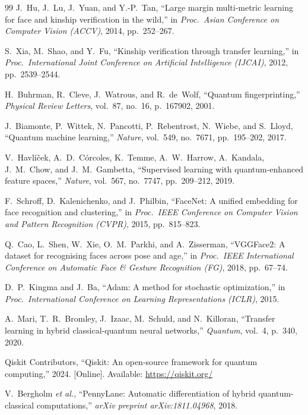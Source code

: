 \documentclass[journal,12pt]{IEEEtran}
\begin{document}
\begin{thebibliography}{99}
J.~Hu, J.~Lu, J.~Yuan, and Y.-P.~Tan,
``Large margin multi-metric learning for face and kinship verification
in the wild,'' in \textit{Proc.\ Asian Conference on Computer Vision
(ACCV)}, 2014, pp.~252--267.

S.~Xia, M.~Shao, and Y.~Fu,
``Kinship verification through transfer learning,''
in \textit{Proc.\ International Joint Conference on Artificial
Intelligence (IJCAI)}, 2012, pp.~2539--2544.

H.~Buhrman, R.~Cleve, J.~Watrous, and R.~de~Wolf,
``Quantum fingerprinting,''
\textit{Physical Review Letters}, vol.~87, no.~16, p.~167902, 2001.

J.~Biamonte, P.~Wittek, N.~Pancotti, P.~Rebentrost, N.~Wiebe, and
S.~Lloyd, ``Quantum machine learning,''
\textit{Nature}, vol.~549, no.~7671, pp.~195--202, 2017.

V.~Havl{\'i}{\v{c}}ek, A.~D.~C{\'o}rcoles, K.~Temme, A.~W.~Harrow,
A.~Kandala, J.~M.~Chow, and J.~M.~Gambetta,
``Supervised learning with quantum-enhanced feature spaces,''
\textit{Nature}, vol.~567, no.~7747, pp.~209--212, 2019.

F.~Schroff, D.~Kalenichenko, and J.~Philbin,
``FaceNet: A unified embedding for face recognition and clustering,''
in \textit{Proc.\ IEEE Conference on Computer Vision and Pattern
Recognition (CVPR)}, 2015, pp.~815--823.

Q.~Cao, L.~Shen, W.~Xie, O.~M.~Parkhi, and A.~Zisserman,
``VGGFace2: A dataset for recognising faces across pose and age,''
in \textit{Proc.\ IEEE International Conference on Automatic Face \&
Gesture Recognition (FG)}, 2018, pp.~67--74.

D.~P.~Kingma and J.~Ba,
``Adam: A method for stochastic optimization,''
in \textit{Proc.\ International Conference on Learning Representations
(ICLR)}, 2015.

A.~Mari, T.~R.~Bromley, J.~Izaac, M.~Schuld, and N.~Killoran,
``Transfer learning in hybrid classical-quantum neural networks,''
\textit{Quantum}, vol.~4, p.~340, 2020.

Qiskit Contributors,
``Qiskit: An open-source framework for quantum computing,''
2024. [Online]. Available: \url{https://qiskit.org/}

V.~Bergholm \textit{et al.},
``PennyLane: Automatic differentiation of hybrid quantum-classical
computations,'' \textit{arXiv preprint arXiv:1811.04968}, 2018.


\end{thebibliography}
\end{document}
